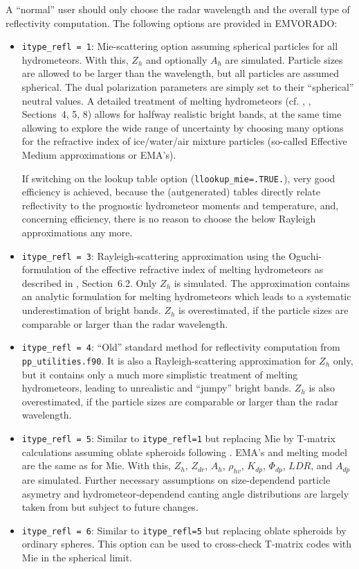 \documentclass[10pt,a4paper,twoside,headinclude,footinclude,parskip=half]{scrartcl}
\newcommand{\citeP}[1]{\citet{#1}}
\newcommand{\citeNPK}[1]{\citeauthor{#1}, \citeyear{#1}}
\newcommand{\srcform}[1]{\mbox{\texttt{#1}}\xspace}%
\newcommand{\paramform}[1]{\mbox{\texttt{#1}}\xspace}%
\begin{document}
A ``normal'' user should only choose the radar wavelength and the overall type of reflectivity computation.
The following options are provided in EMVORADO:
\begin{itemize}
\item \srcform{itype_refl = 1}: Mie-scattering option assuming spherical particles for all hydrometeors. With this, $Z_h$ and optionally $A_h$ are simulated.
  Particle sizes are allowed to be larger than the wavelength, but all particles are assumed spherical. The dual polarization parameters are simply set to their ``spherical'' neutral values.
  A detailed treatment of melting hydrometeors (cf. \citeNPK{blahak2016a}, Sections~4, 5, 8) allows for halfway realistic bright bands, at the same time allowing to explore
  the wide range of uncertainty by choosing many options for the refractive index of ice/water/air mixture particles (so-called Effective Medium
  approximations or EMA's).

  If switching on the lookup table option (\srcform{llookup_mie=.TRUE.}), very good efficiency is achieved, because the (autgenerated) tables directly relate reflectivity to the prognostic
  hydrometeor moments and temperature, and, concerning efficiency, there is no reason to choose the below Rayleigh approximations any more. 
\item \srcform{itype_refl = 3}: Rayleigh-scattering approximation using the Oguchi-formulation of the effective refractive index of melting hydrometeors as described in \citeP{blahak2016a}, Section~6.2. Only $Z_h$ is simulated. The approximation contains an
  analytic formulation for melting hydrometeors which leads to a systematic underestimation of bright bands. $Z_h$ is overestimated, if the particle sizes are comparable or larger than the radar wavelength.
\item \srcform{itype_refl = 4}: ``Old'' standard method for reflectivity computation from \srcform{pp_utilities.f90}. It is also a Rayleigh-scattering approximation for $Z_h$ only, but it contains only a much more simplistic treatment
  of melting hydrometeors, leading to unrealistic and ``jumpy'' bright bands. $Z_h$ is also overestimated, if the particle sizes are comparable or larger than the radar wavelength.
\item \srcform{itype_refl = 5}: Similar to \paramform{itype_refl=1} but replacing Mie by T-matrix calculations assuming oblate spheroids following \citeP{ryzhkov2001,ryzhkov2011}. EMA's and melting model are the same as for Mie.
  With this, $Z_h$, $Z_{dr}$, $A_h$, $\rho_{hv}$, $K_{dp}$, $\Phi_{dp}$, $LDR$, and $A_{dp}$ are simulated.
  Further necessary assumptions on size-dependend particle asymetry and hydrometeor-dependend canting angle distributions are largely taken from \citeP{ryzhkov2011} but subject to future changes.
\item \srcform{itype_refl = 6}: Similar to \paramform{itype_refl=5} but replacing oblate spheroids by ordinary spheres. This option can be used to cross-check T-matrix codes with Mie in the spherical limit.
\end{itemize}
\end{document}
